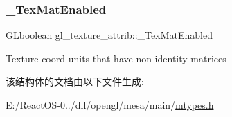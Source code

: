 \subsubsection{\texorpdfstring{\+\_\+\+Tex\+Mat\+Enabled}{\_TexMatEnabled}}
{\footnotesize\ttfamily G\+Lboolean gl\+\_\+texture\+\_\+attrib\+::\+\_\+\+Tex\+Mat\+Enabled}

Texture coord units that have non-\/identity matrices 

该结构体的文档由以下文件生成\+:\begin{DoxyCompactItemize}
\item 
E\+:/\+React\+O\+S-\/0../dll/opengl/mesa/main/\hyperlink{mtypes_8h}{mtypes.\+h}\end{DoxyCompactItemize}
